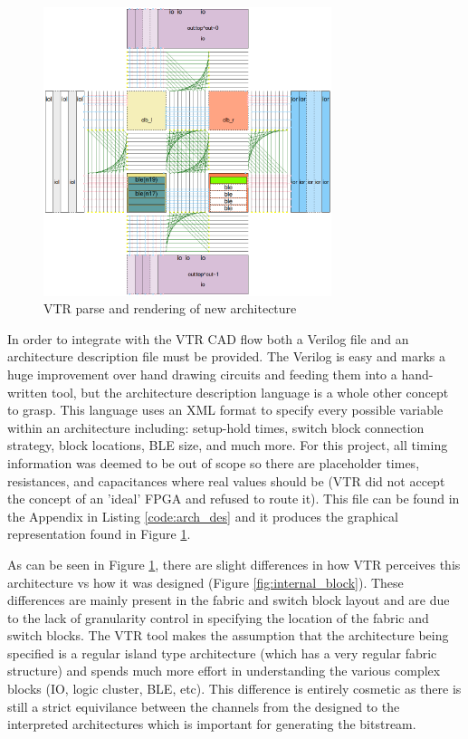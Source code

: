 \documentclass[12pt]{article}
\begin{document}
\begin{figure}[H]
    \centering
    \includegraphics[width=0.75\textwidth]{vtr_arch}
    \caption{VTR parse and rendering of new architecture}
    \label{fig:vtr_arch}
\end{figure}

In order to integrate with the VTR CAD flow both a Verilog file and an architecture
description file must be
provided. The Verilog is easy and marks a huge improvement over hand drawing circuits
and feeding them into a hand-written tool, but the architecture description language
is a whole other concept to grasp. This language uses an XML format to specify every
possible variable within an architecture including: setup-hold times, switch block
connection strategy, block locations, BLE size, and much more. For this project, all
timing information was deemed to be out of scope so there are placeholder times, resistances,
and capacitances where real values should be (VTR did not accept the concept of
an 'ideal' FPGA and refused to route it). This file can be found in the Appendix
in Listing \ref{code:arch_des}
and it produces the graphical representation found in Figure \ref{fig:vtr_arch}.

As can be seen in Figure \ref{fig:vtr_arch}, there are slight differences in how VTR
perceives this architecture vs how it was designed (Figure \ref{fig:internal_block}).
These differences are mainly present in the fabric and switch block layout and are
due to the lack of granularity control in specifying the location of the fabric and switch blocks.
The VTR tool makes the assumption that the architecture being specified is a regular
island type architecture (which has a very regular fabric structure) and spends much
more effort in understanding the various complex blocks (IO, logic cluster, BLE, etc).
This difference is entirely cosmetic as there is still a strict equivilance between
the channels from the designed to the interpreted architectures which is important for
generating the bitstream.
\end{document}
